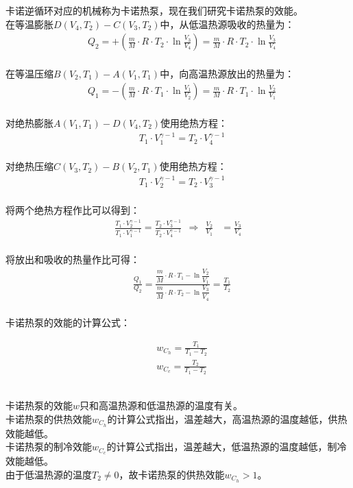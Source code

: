 \documentclass[UTF8]{ctexart}
\begin{document}
    卡诺逆循环对应的机械称为卡诺热泵，现在我们研究卡诺热泵的效能。\\[3mm]
    在等温膨胀$D(V_4,T_2)-C(V_3,T_2)$中，从低温热源吸收的热量为：\vspace{5pt}
    \begin{align}
        &Q_2=+\left(\frac{m}{M}\cdot R\cdot T_2\cdot\ln{\frac{V_3}{V_4}}\right)=\frac{m}{M}\cdot R\cdot T_2\cdot\ln{\frac{V_3}{V_4}}
    \end{align}\\
    在等温压缩$B(V_2,T_1)-A(V_1,T_1)$中，向高温热源放出的热量为：\vspace{5pt}
    \begin{align}
        &Q_1=-\left(\frac{m}{M}\cdot R\cdot T_1\cdot\ln{\frac{V_1}{V_2}}\right)=\frac{m}{M}\cdot R\cdot T_1\cdot\ln{\frac{V_2}{V_1}}
    \end{align}\\
    对绝热膨胀$A(V_1,T_1)-D(V_4,T_2)$使用绝热方程：
    \begin{align}
        &T_1\cdot V_1^{\gamma-1}=T_2\cdot V_4^{\gamma-1}
    \end{align}\\
    对绝热压缩$C(V_3,T_2)-B(V_2,T_1)$使用绝热方程：
    \begin{align}
        &T_1\cdot V_2^{\gamma-1}=T_2\cdot V_3^{\gamma-1}
    \end{align}\\
    将两个绝热方程作比可以得到：
    \begin{align}
        \frac{T_1\cdot V_2^{\gamma-1}}{T_1\cdot V_1^{\gamma-1}}=\frac{T_2\cdot V_3^{\gamma-1}}{T_2\cdot V_4^{\gamma-1}}~~\Rightarrow~~\frac{V_2}{V_1}&=\frac{V_3}{V_4}
    \end{align}\\
    将放出和吸收的热量作比可得：
    \begin{align}
        &\frac{Q_1}{Q_2}=\frac{\dfrac{m}{M}\cdot R\cdot T_1-\ln{\dfrac{V_2}{V_1}}}{\dfrac{m}{M}\cdot R\cdot T_2-\ln{\dfrac{V_3}{V_4}}}=\frac{T_1}{T_2}
    \end{align}\\
    卡诺热泵的效能的计算公式：
    \begin{large}
        \begin{align*}
            &w_{C_h}=\frac{T_1}{T_1-T_2}\\[4mm]
            &w_{C_c}=\frac{T_2}{T_1-T_2}
        \end{align*}
    \end{large}\\
    卡诺热泵的效能$w$只和高温热源和低温热源的温度有关。\\[3mm]
    卡诺热泵的供热效能$w_{C_h}$的计算公式指出，温差越大，高温热源的温度越低，供热效能越低。\\[3mm]
    卡诺热泵的制冷效能$w_{C_c}$的计算公式指出，温差越大，低温热源的温度越低，制冷效能越低。\\[3mm]
    由于低温热源的温度$T_2\neq 0$，故卡诺热泵的供热效能$w_{C_h}>1$。
\end{document}
